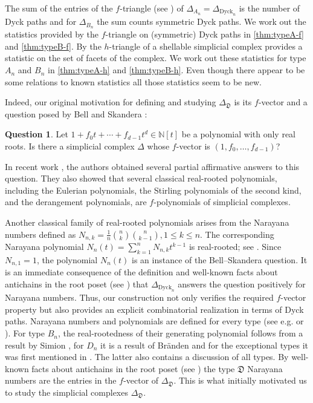 \documentclass[11pt]{amsart}
\def\NN{\mathbb{N}}
\def\Dyck{\mathrm{Dyck}}
\def\fD{\mathfrak{D}}
\theoremstyle{plain}
\numberwithin{lemma}{\DefaultNumberTheoremWithin}
\numberwithin{theorem}{\DefaultNumberTheoremWithin}
\numberwithin{corollary}{\DefaultNumberTheoremWithin}
\numberwithin{proposition}{\DefaultNumberTheoremWithin}
\numberwithin{conjecture}{\DefaultNumberTheoremWithin}
\theoremstyle{definition}
\numberwithin{definition}{\DefaultNumberTheoremWithin}
\newtheorem{question}{Question}
\numberwithin{question}{\DefaultNumberTheoremWithin}
\numberwithin{problem}{\DefaultNumberTheoremWithin}
\theoremstyle{remark}
\numberwithin{remark}{\DefaultNumberTheoremWithin}
\numberwithin{example}{\DefaultNumberTheoremWithin}
\numberwithin{claim}{\DefaultNumberTheoremWithin}
\begin{document}
The sum of the entries of the $f$-triangle (see \cite{BjoWac96}) of $\Delta_{A_n} = \Delta_{\Dyck_n}$ is the number of Dyck paths and for $\Delta_{B_n}$ the sum counts symmetric Dyck paths. We work out the statistics provided by the $f$-triangle on (symmetric) Dyck paths in \ref{thm:typeA-f} and \ref{thm:typeB-f}. By \cite{BjoWac96} the $h$-triangle of a shellable simplicial complex provides a statistic on the set of facets of the complex. 
We work out these statistics for type $A_n$ and $B_n$ in \ref{thm:typeA-h} and \ref{thm:typeB-h}. Even though there appear to be some relations to known statistics all those statistics seem to be new.

Indeed, our original motivation for defining and studying $\Delta_{\fD}$ 
is its $f$-vector and a
question posed by Bell and Skandera \cite{BS07}:

\begin{question} \label{que:bs}
Let 
$1+f_0t+\cdots +f_{d-1}t^d \in \NN[t]$ be a polynomial with
only real roots. Is there a simplicial complex 
$\Delta$ whose $f$-vector is $(1,f_0,\ldots, f_{d-1})$? 
\end{question}

In recent work \cite{MW26}, the authors obtained several partial
affirmative answers to this question. 
They also showed that several classical real-rooted
polynomials, including the Eulerian polynomials, the Stirling
polynomials of the second kind, and the derangement polynomials, are
$f$-polynomials of simplicial complexes.

Another classical family of real-rooted
polynomials arises from the Narayana numbers defined as
$
N_{n,k}
=
\frac{1}{n}\binom{n}{k}\binom{n}{k-1},
 1\leq k\leq n.
$
The corresponding Narayana polynomial
$
N_n(t)=\sum_{k=1}^{n}N_{n,k}t^{k-1}
$
is real-rooted; see \cite[Theorem~5.3.1]{Bre89}. Since
$N_{n,1}=1$, the polynomial $N_n(t)$ is an instance of the
Bell--Skandera question. It is an immediate consequence of the definition and well-known facts about antichains in the root poset (see \cite{Rin18}) that $\Delta_{\Dyck_n}$ answers the question positively for Narayana numbers.
Thus, our construction not only verifies the required
$f$-vector property but also provides an explicit combinatorial
realization in terms of Dyck paths. Narayana numbers and polynomials are defined for every type 
(see e.g. \cite{Arm09} or \cite{Rin16}). 
For type $B_n$, the real-rootedness of their generating polynomial follows from 
a result by Simion \cite{Sim84}, for $D_n$ it is a result of Br\"anden \cite{Bra04} and
for the exceptional types it was first mentioned in \cite[Section 5.2]{RW05}. The latter also contains
a discussion of all types. 
By well-known facts about antichains in the root poset (see \cite{Rin18}) the type $\fD$ Narayana numbers are the entries in the $f$-vector of $\Delta_{\fD}$. This is what initially motivated us to  study the simplicial complexes
$\Delta_{\fD}$.
\end{document}
